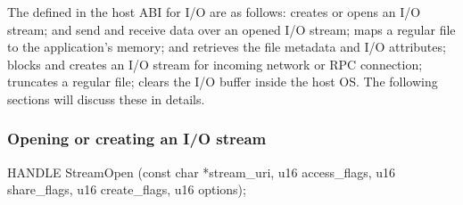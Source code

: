 The \hostapis{} defined in the host ABI for I/O are as follows:
 creates or opens an I/O stream;
 and 
send and receive data over an opened I/O stream;
 maps %
a regular file to the application's memory; %
 and 
retrieves the file metadata and I/O attributes;
 blocks and creates an I/O stream for incoming network or RPC connection;
 truncates a regular file;
 clears the I/O buffer inside the host OS.
The following sections will discuss these \hostapis{} in details.





\subsubsection*{Opening or creating an I/O stream}




\begin{paldef}
HANDLE StreamOpen (const char *stream_uri,
                   u16 access_flags, u16 share_flags,
                   u16 create_flags, u16 options);
\end{paldef}



